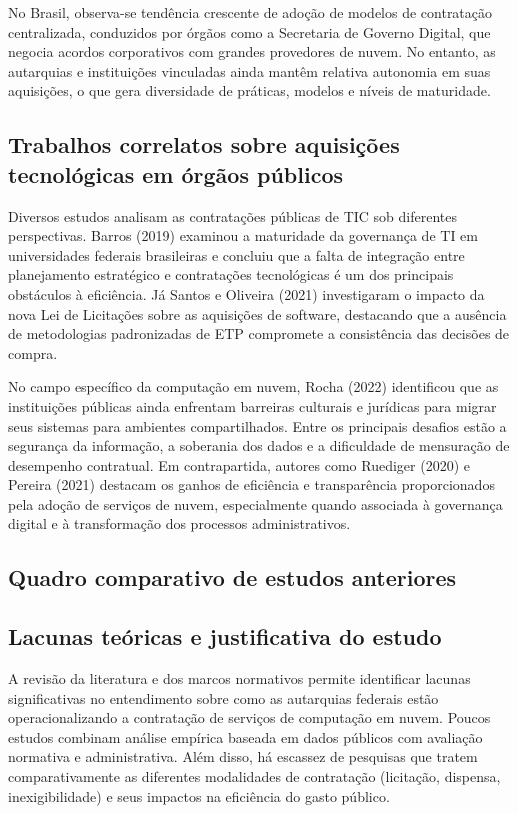 \documentclass[a4paper, 12pt,brazil]{article}
\begin{document}
No Brasil, observa-se tendência crescente de adoção de modelos de contratação centralizada, conduzidos por órgãos como a Secretaria de Governo Digital, que negocia acordos corporativos com grandes provedores de nuvem. No entanto, as autarquias e instituições vinculadas ainda mantêm relativa autonomia em suas aquisições, o que gera diversidade de práticas, modelos e níveis de maturidade.

\subsection{Trabalhos correlatos sobre aquisições tecnológicas em órgãos públicos}

Diversos estudos analisam as contratações públicas de TIC sob diferentes perspectivas. Barros (2019) examinou a maturidade da governança de TI em universidades federais brasileiras e concluiu que a falta de integração entre planejamento estratégico e contratações tecnológicas é um dos principais obstáculos à eficiência. Já Santos e Oliveira (2021) investigaram o impacto da nova Lei de Licitações sobre as aquisições de software, destacando que a ausência de metodologias padronizadas de ETP compromete a consistência das decisões de compra.

No campo específico da computação em nuvem, Rocha (2022) identificou que as instituições públicas ainda enfrentam barreiras culturais e jurídicas para migrar seus sistemas para ambientes compartilhados. Entre os principais desafios estão a segurança da informação, a soberania dos dados e a dificuldade de mensuração de desempenho contratual. Em contrapartida, autores como Ruediger (2020) e Pereira (2021) destacam os ganhos de eficiência e transparência proporcionados pela adoção de serviços de nuvem, especialmente quando associada à governança digital e à transformação dos processos administrativos.

\subsection{Quadro comparativo de estudos anteriores}



\subsection{Lacunas teóricas e justificativa do estudo}

A revisão da literatura e dos marcos normativos permite identificar lacunas significativas no entendimento sobre como as autarquias federais estão operacionalizando a contratação de serviços de computação em nuvem. Poucos estudos combinam análise empírica baseada em dados públicos com avaliação normativa e administrativa. Além disso, há escassez de pesquisas que tratem comparativamente as diferentes modalidades de contratação (licitação, dispensa, inexigibilidade) e seus impactos na eficiência do gasto público.
\end{document}
